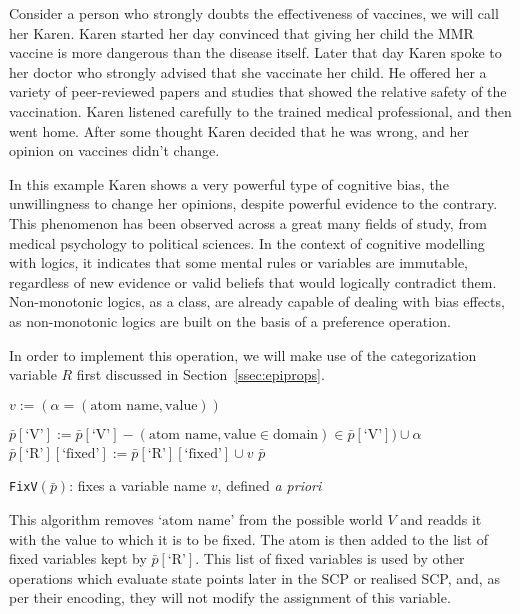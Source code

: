 Consider a person who strongly doubts the effectiveness of vaccines, we will call her Karen. Karen started her day convinced that giving her child the MMR vaccine is more dangerous than the disease itself. Later that day Karen spoke to her doctor who strongly advised that she vaccinate her child. He offered her a variety of peer-reviewed papers and studies that showed the relative safety of the vaccination. Karen listened carefully to the trained medical professional, and then went home. After some thought Karen decided that he was wrong, and her opinion on vaccines didn't change.

In this example Karen shows a very powerful type of cognitive bias, the unwillingness to change her opinions, despite powerful evidence to the contrary. This phenomenon has been observed across a great many fields of study, from medical psychology\citep{brown2010omission}\citep{wroe2005feeling} to political sciences\citep{tappin2017heart}. In the context of cognitive modelling with logics, it indicates that some mental rules or variables are immutable, regardless of new evidence or valid beliefs that would logically contradict them. Non-monotonic logics, as a class, are already capable of dealing with bias effects, as non-monotonic logics are built on the basis of a preference operation.

In order to implement this operation, we will make use of the categorization variable $R$ first discussed in Section~\ref{ssec:epiprops}.

\begin{algorithm}[H]
\SetAlgoLined
{}
$v:= (\alpha = (\text{atom name}, \text{value}))$\;

{
$\bar{p}[\textrm{`V'}]:=\bar{p}[\textrm{`V'}] - (\text{atom name}, \text{value} \in \text{domain}) \in \bar{p}[\textrm{`V'}]) \cup \alpha$\;
$\bar{p}[\textrm{`R'}][\text{`fixed'}]:= \bar{p}[\textrm{`R'}][\text{`fixed'}] \cup v$\;
\Return $\bar{p}$
}

\caption{\texttt{FixV}$(\bar{p})$: fixes a variable name $v$, defined \textit{a priori}}
 \label{cogOp:fixV}
\end{algorithm}


This algorithm removes `$\text{atom name}$' from the possible world $V$ and readds it with the value to which it is to be fixed. The atom is then added to the list of fixed variables kept by $\bar{p}[\textrm{`R'}]$. This list of fixed variables is used by other operations which evaluate state points later in the SCP or realised SCP, and, as per their encoding, they will not modify the assignment of this variable.


